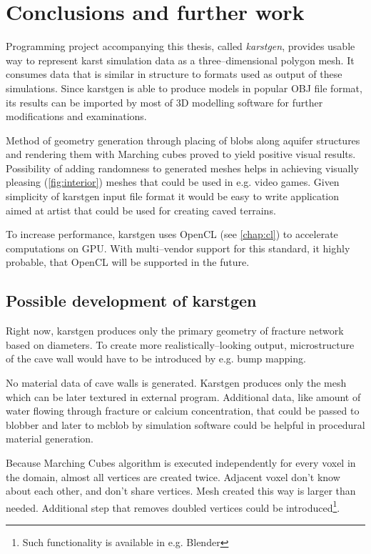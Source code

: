 \chapter{Conclusions and further work}
\label{chap:furtherwork}

Programming project accompanying this thesis, called \emph{karstgen}, provides
usable way to represent karst simulation data as a three--dimensional polygon
mesh. It consumes data that is similar in structure to formats used as output of
these simulations. Since karstgen is able to produce models in popular OBJ file
format, its results can be imported by most of 3D modelling software for further
modifications and examinations.

Method of geometry generation through placing of blobs along aquifer structures
and rendering them with Marching cubes proved to yield positive visual results.
Possibility of adding randomness to generated meshes helps in achieving
visually pleasing (\autoref{fig:interior}) meshes that could be used in e.g.
video games. Given simplicity of karstgen input file format it would be easy to
write application aimed at artist that could be used for creating caved terrains.

To increase performance, karstgen uses OpenCL (see \autoref{chap:cl}) to
accelerate computations on GPU. With multi--vendor support for this standard,
it highly probable, that OpenCL will be supported in the future.

\section{Possible development of karstgen}

Right now, karstgen produces only the primary geometry of fracture network based
on diameters. To create more realistically--looking output, microstructure of
the cave wall would have to be introduced by e.g. bump mapping.

No material data of cave walls is generated. Karstgen produces only the mesh which
can be later textured in external program. Additional data, like amount of water
flowing through fracture or calcium concentration, that could be passed to blobber
and later to mcblob by simulation software could be helpful in procedural
material generation.

Because Marching Cubes algorithm is executed independently for every voxel in the
domain, almost all vertices are created twice. Adjacent voxel don't know about
each other, and don't share vertices. Mesh created this way is larger than
needed. Additional step that removes doubled vertices could be
introduced\footnote{Such functionality is available in e.g. Blender}.

